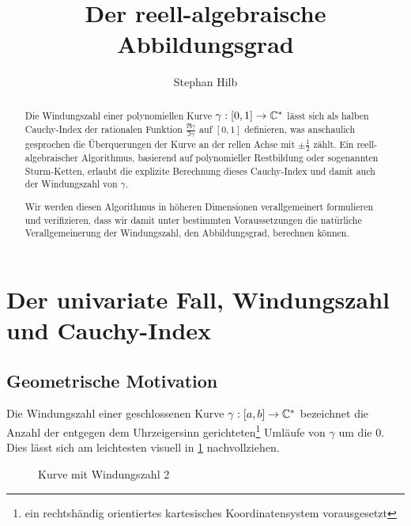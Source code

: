 \documentclass{mythesis}
\title{Der reell-algebraische Abbildungsgrad}
\author{Stephan Hilb}
\begin{document}
\maketitle

\begin{abstract}
    Die Windungszahl einer polynomiellen Kurve $\gamma: [0, 1] \to \mathbb { C }^*$ lässt sich als halben Cauchy-Index der rationalen Funktion $\frac{\Re \gamma}{\Im \gamma}$ auf $[0,1]$ definieren, was anschaulich gesprochen die Überquerungen der Kurve an der rellen Achse mit $\pm \frac{1}{2}$ zählt.
    Ein reell-algebraischer Algorithmus, basierend auf polynomieller Restbildung oder sogenannten Sturm-Ketten, erlaubt die explizite Berechnung dieses Cauchy-Index und damit auch der Windungszahl von $\gamma$.

    \fixme Wir werden diesen Algorithmus in höheren Dimensionen verallgemeinert formulieren und verifizieren, dass wir damit unter bestimmten Voraussetzungen die natürliche Verallgemeinerung der Windungszahl, den Abbildungsgrad, berechnen können.
\end{abstract}

\tableofcontents



\section{Der univariate Fall, Windungszahl und Cauchy-Index}

\subsection{Geometrische Motivation}

Die Windungszahl einer geschlossenen Kurve $\gamma: [a,b] \to \mathbb { C }^*$ bezeichnet die Anzahl der entgegen dem Uhrzeigersinn gerichteten\footnote{ein rechtshändig orientiertes kartesisches Koordinatensystem vorausgesetzt} Umläufe von $\gamma$ um die $0$.
Dies lässt sich am leichtesten visuell in \ref{fig:winding_number} nachvollziehen.

\begin{figure}[ht]
    \centering
    \caption{Kurve mit Windungszahl 2}
    \label{fig:winding_number}
\end{figure}
\end{document}
